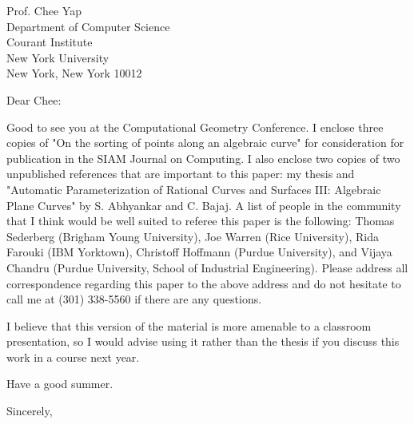 \signature{John K. Johnstone}

\begin{letter}
{Prof. Chee Yap \\
Department of Computer Science \\
Courant Institute \\
New York University \\
New York, New York  10012}

\opening{Dear Chee:}

Good to see you at the Computational Geometry Conference.
I enclose three copies of "On the sorting of points along an algebraic curve"
for consideration for publication in the SIAM Journal on Computing.
I also enclose two copies of two unpublished references that are important to
this paper: my thesis and 
"Automatic Parameterization of Rational Curves and Surfaces III: Algebraic
Plane Curves" by S. Abhyankar and C. Bajaj.
A list of people in the community that I think would be well suited 
to referee this paper is the following: Thomas Sederberg (Brigham Young University),
Joe Warren (Rice University), Rida Farouki (IBM Yorktown), Christoff Hoffmann 
(Purdue University), and Vijaya Chandru (Purdue University, School of Industrial
Engineering).
Please address all correspondence regarding this paper to the above address 
and do not hesitate to call me at (301) 338-5560 if there are any questions.

I believe that this version of the material is more amenable to a classroom
presentation, so I would advise using it rather than the thesis if you discuss
this work in a course next year.

Have a good summer.

\closing{Sincerely,}
\end{letter}


